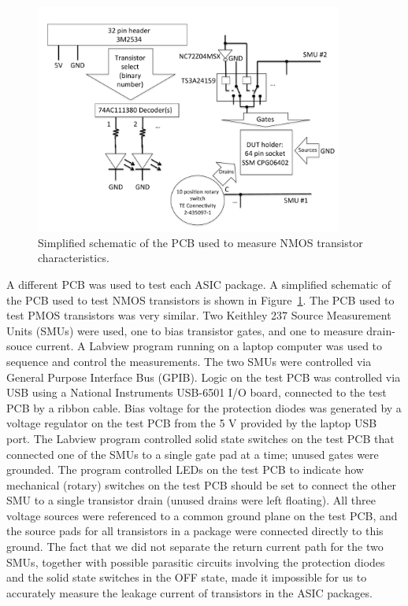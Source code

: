 \begin{figure}
\begin{center}
\includegraphics[width=0.9\textwidth]{NMOSTPCB.pdf}
\caption{Simplified schematic of the PCB used to measure NMOS transistor characteristics.}
\label{fig:testpcb}
\end{center}
\end{figure}

A different PCB was used to test each ASIC package. A simplified schematic of the PCB used to test NMOS transistors is shown in Figure~\ref{fig:testpcb}.  The PCB used to test PMOS transistors was very similar.
Two Keithley\cite{Keithley} 237 Source Measurement Units (SMUs)\cite{K237} were used, one to bias transistor gates, and one to measure drain-souce current.  A Labview\cite{Labview} program running on a laptop computer was used to sequence and control the measurements.  
The two SMUs were controlled via General Purpose Interface Bus (GPIB)\cite{GPIB}.
Logic on the test PCB was controlled via USB using a National Instruments\cite{NI} USB-6501 I/O board\cite{6501}, connected to the test PCB by a ribbon cable.
Bias voltage for the protection diodes was generated by a voltage regulator on the test PCB from the 5 V provided by the laptop USB port.  The Labview program controlled solid state switches on the test PCB that connected one of the SMUs to a single gate pad at a time; unused gates were grounded.  The program controlled LEDs on the test PCB to indicate how mechanical (rotary) switches on the test PCB should be set to connect the other SMU to a single transistor drain (unused drains were left floating).  All three voltage sources were referenced to a common ground plane on the test PCB, and the source pads for all transistors in a package were connected directly to this ground.  The fact that we did not separate the return current path for the two SMUs, together with possible parasitic circuits involving the protection diodes and the solid state switches in the OFF state, made it impossible for us to accurately measure the leakage current of transistors in the ASIC packages.

